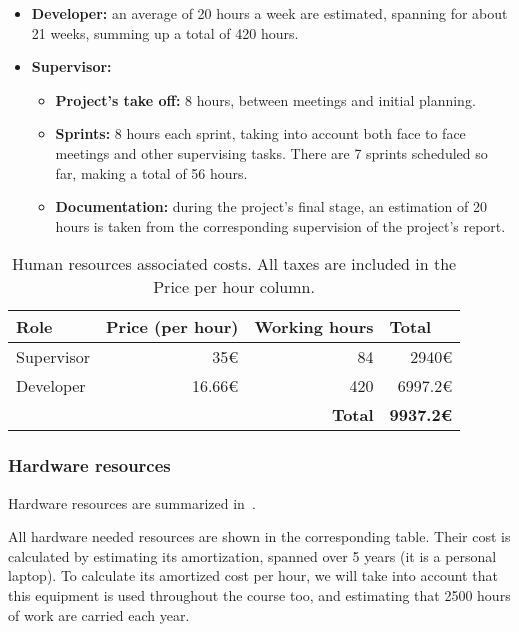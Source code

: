 \begin{itemize}
	\item \textbf{Developer:} an average of 20 hours a week are estimated, spanning for about 21 weeks, summing up a total of 420 hours.
	\item \textbf{Supervisor:}
	\begin{itemize}
		\item \textbf{Project’s take off:} 8 hours, between meetings and initial planning.
		\item \textbf{Sprints:} 8 hours each sprint, taking into account both face to face meetings and other supervising tasks. There are 7 sprints scheduled so far, making a total of 56 hours.
		\item \textbf{Documentation:} during the project’s final stage, an estimation of 20 hours is taken from the corresponding supervision of the project’s report.
	\end{itemize}
\end{itemize}

\begin{table}[h]
	\centering
	\begin{tabular}{lllr}
		\hline
		\textbf{Role} & \textbf{Price (per hour)} & \textbf{Working  hours} & \multicolumn{1}{l}{\textbf{Total}} \\ \hline
		Supervisor & \multicolumn{1}{r}{35€} & \multicolumn{1}{r}{84} & 2940€ \\
		Developer & \multicolumn{1}{r}{16.66€} & \multicolumn{1}{r}{420} & 6997.2€ \\ \hline
		&  & \multicolumn{1}{r}{\textbf{Total}} & \textbf{9937.2€}
	\end{tabular}
	\caption{Human resources associated costs. All taxes are included in the Price per hour column.}
	\label{table:human-resources}
\end{table}

\subsubsection{Hardware resources}

Hardware resources are summarized in~.

All hardware needed resources are shown in the corresponding table. Their cost is calculated by estimating its amortization, spanned over 5 years (it is a personal laptop). To calculate its amortized cost per hour, we will take into account that this equipment is used throughout the course too, and estimating that 2500 hours of work are carried each year.

